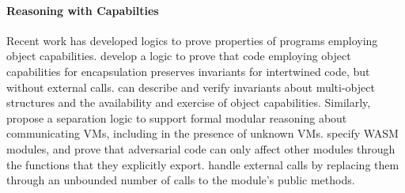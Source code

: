 

\paragraph{Reasoning with Capabilties}
%
 Recent work has developed logics to prove properties of programs employing object capabilities.
\citet{ddd} develop a logic to prove that code employing object
capabilities for encapsulation preserves invariants for
intertwined code, but without external calls. 
  \citet{dd}  can describe and verify invariants
about multi-object structures and the availability and exercise of object capabilities.  %
 Similarly,
{\citet{vmsl-pldi2023} propose a separation logic to support formal modular reasoning about communicating VMs, including in the presence of unknown VMs.
\citet{irisWasm23} specify WASM modules, %
and prove that adversarial code  can only affect other modules through the functions} that they explicitly export. 
\citet{CassezFQ24}  handle external calls by replacing them through an unbounded number of calls to the module's public methods.
 
